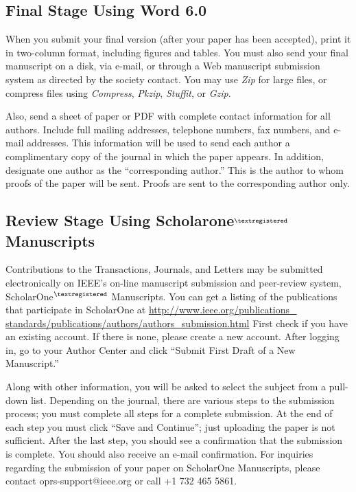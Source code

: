 \documentclass[journal]{IEEEtai}
\begin{document}
\subsection{Final Stage Using Word 6.0}

When you submit your final version (after your paper has been accepted), print it in two-column format, including figures and tables. You must also send your final manuscript on a disk, via e-mail, or through a Web manuscript submission system as directed by the society contact. You may use {\it Zip} for large files, or compress files using {\it Compress}, {\it Pkzip}, {\it Stuffit}, or {\it Gzip}. 

Also, send a sheet of paper or PDF with complete contact information for all authors. Include full mailing addresses, telephone numbers, fax numbers, and e-mail addresses. This information will be used to send each author a complimentary copy of the journal in which the paper appears. In addition, designate one author as the ``corresponding author.'' This is the author to whom proofs of the paper will be sent. Proofs are sent to the corresponding author only.

\subsection{Review Stage Using Scholarone$^{\scriptsize\textregistered}$ Manuscripts}

Contributions to the Transactions, Journals, and Letters may be submitted electronically on IEEE's on-line manuscript submission and peer-review system, ScholarOne$^{\scriptsize\textregistered}$ Manuscripts. You can get a listing of the publications that participate in ScholarOne at \underline{http://www.ieee.org/publications\_} \underline{standards/publications/authors/authors\_submission.html} First check if you have an existing account. If there is none, please create a new account. After logging in, go to your Author Center and click ``Submit First Draft of a New Manuscript.'' 



Along with other information, you will be asked to select the subject from a pull-down list. Depending on the journal, there are various steps to the submission process; you must complete all steps for a complete submission. At the end of each step you must click ``Save and Continue''; just uploading the paper is not sufficient. After the last step, you should see a confirmation that the submission is complete. You should also receive an e-mail confirmation. For inquiries regarding the submission of your paper on ScholarOne Manuscripts, please contact oprs-support@ieee.org or call +1 732 465 5861.
\end{document}
